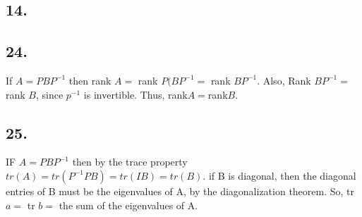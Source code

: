 \documentclass[12]{scrartcl}
\begin{document}
\subsection*{14.}

\subsection*{24.}
If $A = PBP^{-1}$ then rank $A =$ rank $P(BP^{-1} =$ rank $BP^{-1}$. Also, Rank $BP^{-1} = $ rank $B$, since $p^{-1}$ is invertible. Thus, rank$A = $rank$B$.  
\subsection*{25.}
IF $A = PBP^{-1}$ then by the trace property $tr(A) = tr(P^{-1}PB) = tr(IB) = tr(B).$ if B is diagonal, then the diagonal entries of B must be the eigenvalues of A, by the diagonalization theorem. So, tr$a = $ tr $b=$ the sum of the eigenvalues of A. 
\end{document}
